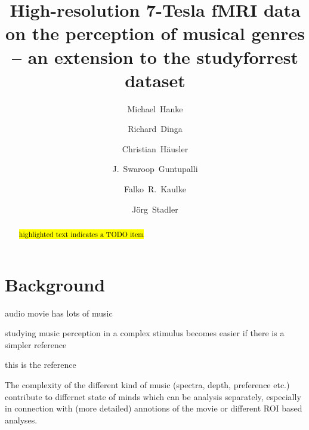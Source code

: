 



\title{High-resolution 7-Tesla fMRI data on the perception of musical genres -- an extension to the studyforrest dataset}

\author[1,2]{Michael~Hanke}
\author[1]{Richard~Dinga}
\author[1]{Christian~Häusler}
\author[3]{J.~Swaroop~Guntupalli}
\author[1,4]{Falko~R.~Kaulke}
\author[5]{J\"org~Stadler}

\maketitle
\thispagestyle{fancy}

\begin{abstract}
\hl{highlighted text indicates a TODO item}
\end{abstract}
\clearpage

\section*{Background}

audio movie has lots of music

studying music perception in a complex stimulus becomes easier if there is a simpler reference

this is the reference

\cite{CTK+2012}

The complexity of the different kind of music (spectra, depth, preference etc.)  contribute to differnet state of minds which can be analysis separately, especially in connection with (more detailed) annotions of the movie or different ROI based analyses.

